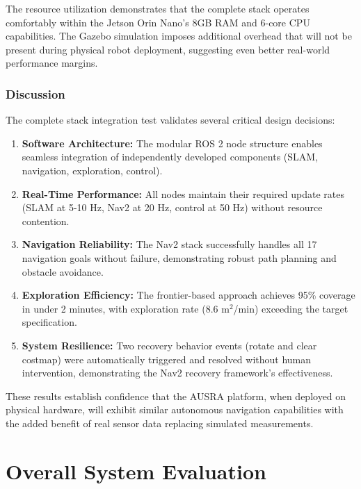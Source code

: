 The resource utilization demonstrates that the complete stack operates comfortably within the Jetson Orin Nano's 8GB RAM and 6-core CPU capabilities. The Gazebo simulation imposes additional overhead that will not be present during physical robot deployment, suggesting even better real-world performance margins.

\subsubsection{Discussion}

The complete stack integration test validates several critical design decisions:

\begin{enumerate}
    \item \textbf{Software Architecture:} The modular ROS 2 node structure enables seamless integration of independently developed components (SLAM, navigation, exploration, control).
    
    \item \textbf{Real-Time Performance:} All nodes maintain their required update rates (SLAM at 5-10 Hz, Nav2 at 20 Hz, control at 50 Hz) without resource contention.
    
    \item \textbf{Navigation Reliability:} The Nav2 stack successfully handles all 17 navigation goals without failure, demonstrating robust path planning and obstacle avoidance.
    
    \item \textbf{Exploration Efficiency:} The frontier-based approach achieves 95\% coverage in under 2 minutes, with exploration rate (8.6 m$^2$/min) exceeding the target specification.
    
    \item \textbf{System Resilience:} Two recovery behavior events (rotate and clear costmap) were automatically triggered and resolved without human intervention, demonstrating the Nav2 recovery framework's effectiveness.
\end{enumerate}

These results establish confidence that the AUSRA platform, when deployed on physical hardware, will exhibit similar autonomous navigation capabilities with the added benefit of real sensor data replacing simulated measurements.

\section{Overall System Evaluation}
\label{sec:overall_evaluation}


